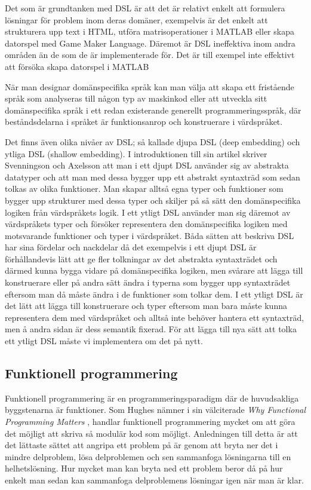 \documentclass[]{article}
\begin{document}
Det som är grundtanken med DSL är att det är relativt enkelt att formulera lösningar
för problem inom deras domäner, exempelvis är det enkelt att strukturera upp text i
HTML, utföra matrisoperationer i MATLAB eller skapa datorspel med Game Maker Language.
Däremot är DSL ineffektiva inom andra områden än de som de är implementerade för.
Det är till exempel inte effektivt att försöka skapa datorspel i MATLAB

När man designar domänspecifika språk kan man välja att skapa ett fristående
språk som analyseras till någon typ av maskinkod eller att utveckla sitt
domänspecifika språk i ett redan existerande generellt programmeringsspråk,
där beståndsdelarna i språket är funktionsanrop och konstruerare i värdspråket.

Det finns även olika nivåer av DSL; så kallade djupa DSL (deep embedding) och
ytliga DSL (shallow embedding). I introduktionen till sin artikel skriver
Svenningson och Axelsson \cite{Svenningsson2013} att man i ett djupt
DSL använder sig av abstrakta datatyper och att man med dessa bygger upp ett
abstrakt syntaxträd som sedan tolkas av olika funktioner.
Man skapar alltså egna typer och funktioner som bygger upp strukturer med dessa
typer och skiljer på så sätt den domänspecifika logiken från värdspråkets logik.
I ett ytligt DSL använder man sig däremot av värdspråkets typer och försöker
representera den domänspecifika logiken med motsvarande funktioner och
typer i värdspråket.
Båda sätten att beskriva DSL har sina fördelar och nackdelar då det exempelvis
i ett djupt DSL är förhållandevis lätt att ge fler tolkningar av det abstrakta
syntaxträdet och därmed kunna bygga vidare på domänspecifika logiken,
men svårare att lägga till konstruerare eller på andra sätt ändra i typerna som
bygger upp syntaxträdet eftersom man då måste ändra i de funktioner som tolkar
dem. I ett ytligt DSL är det lätt att lägga till konstruerare och typer
eftersom man bara måste kunna representera dem med värdspråket och alltså inte
behöver hantera ett syntaxträd, men å andra sidan är dess semantik fixerad.
För att lägga till nya sätt att tolka ett ytligt DSL måste vi implementera
om det på nytt.

\subsection{Funktionell programmering}
Funktionell programmering är en programmeringsparadigm där de huvudsakliga
byggstenarna är funktioner.
Som Hughes nämner i sin välciterade \textit{Why Functional Programming Matters}
\cite{hughes1989functional}, handlar funktionell programmering mycket om att göra det
möjligt att skriva så modulär kod som möjligt.
Anledningen till detta är att det lättaste sättet att angripa ett problem på är
genom att bryta ner det i mindre delproblem, lösa delproblemen och sen
sammanfoga lösningarna till en helhetslösning.
Hur mycket man kan bryta ned ett problem beror då på hur enkelt man sedan kan
sammanfoga delproblemens lösningar igen när man är klar.
\end{document}
